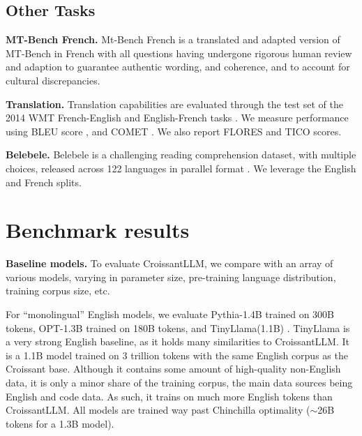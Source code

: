 \subsection{Other Tasks}

\textbf{MT-Bench French.} Mt-Bench French is a translated and adapted version of MT-Bench in French with all questions having undergone rigorous human review and adaption to guarantee authentic wording, and coherence, and to account for cultural discrepancies.

\textbf{Translation.} Translation capabilities are evaluated through the test set of the 2014 WMT French-English and English-French tasks . We measure performance using BLEU score , and COMET . We also report FLORES  and TICO  scores.


\textbf{Belebele.} Belebele is a challenging reading comprehension dataset, with multiple choices, released across 122 languages in parallel format . We leverage the English and French splits.





\section{Benchmark results}

\textbf{Baseline models.} To evaluate CroissantLLM, we compare with an array of various models, varying in parameter size, pre-training language distribution, training corpus size, etc.

For ``monolingual'' English models, we evaluate Pythia-1.4B  trained on 300B tokens, OPT-1.3B  trained on 180B tokens, and TinyLlama(1.1B) . TinyLlama is a very strong English baseline, as it holds many similarities to CroissantLLM. It is a 1.1B model trained on 3 trillion tokens with the same English corpus as the Croissant base. Although it contains some amount of high-quality non-English data, it is only a minor share of the training corpus, the main data sources being English and code data. As such, it trains on much more English tokens than CroissantLLM. All models are trained way past Chinchilla optimality ($\sim$26B tokens for a 1.3B model).

